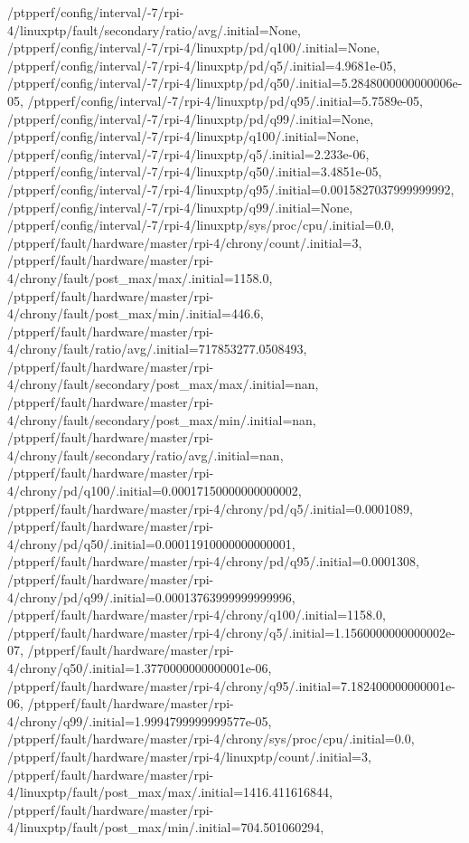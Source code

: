{    /ptpperf/config/interval/-7/rpi-4/linuxptp/fault/secondary/ratio/avg/.initial=None,
    /ptpperf/config/interval/-7/rpi-4/linuxptp/pd/q100/.initial=None,
    /ptpperf/config/interval/-7/rpi-4/linuxptp/pd/q5/.initial=4.9681e-05,
    /ptpperf/config/interval/-7/rpi-4/linuxptp/pd/q50/.initial=5.2848000000000006e-05,
    /ptpperf/config/interval/-7/rpi-4/linuxptp/pd/q95/.initial=5.7589e-05,
    /ptpperf/config/interval/-7/rpi-4/linuxptp/pd/q99/.initial=None,
    /ptpperf/config/interval/-7/rpi-4/linuxptp/q100/.initial=None,
    /ptpperf/config/interval/-7/rpi-4/linuxptp/q5/.initial=2.233e-06,
    /ptpperf/config/interval/-7/rpi-4/linuxptp/q50/.initial=3.4851e-05,
    /ptpperf/config/interval/-7/rpi-4/linuxptp/q95/.initial=0.0015827037999999992,
    /ptpperf/config/interval/-7/rpi-4/linuxptp/q99/.initial=None,
    /ptpperf/config/interval/-7/rpi-4/linuxptp/sys/proc/cpu/.initial=0.0,
    /ptpperf/fault/hardware/master/rpi-4/chrony/count/.initial=3,
    /ptpperf/fault/hardware/master/rpi-4/chrony/fault/post_max/max/.initial=1158.0,
    /ptpperf/fault/hardware/master/rpi-4/chrony/fault/post_max/min/.initial=446.6,
    /ptpperf/fault/hardware/master/rpi-4/chrony/fault/ratio/avg/.initial=717853277.0508493,
    /ptpperf/fault/hardware/master/rpi-4/chrony/fault/secondary/post_max/max/.initial=nan,
    /ptpperf/fault/hardware/master/rpi-4/chrony/fault/secondary/post_max/min/.initial=nan,
    /ptpperf/fault/hardware/master/rpi-4/chrony/fault/secondary/ratio/avg/.initial=nan,
    /ptpperf/fault/hardware/master/rpi-4/chrony/pd/q100/.initial=0.00017150000000000002,
    /ptpperf/fault/hardware/master/rpi-4/chrony/pd/q5/.initial=0.0001089,
    /ptpperf/fault/hardware/master/rpi-4/chrony/pd/q50/.initial=0.00011910000000000001,
    /ptpperf/fault/hardware/master/rpi-4/chrony/pd/q95/.initial=0.0001308,
    /ptpperf/fault/hardware/master/rpi-4/chrony/pd/q99/.initial=0.00013763999999999996,
    /ptpperf/fault/hardware/master/rpi-4/chrony/q100/.initial=1158.0,
    /ptpperf/fault/hardware/master/rpi-4/chrony/q5/.initial=1.1560000000000002e-07,
    /ptpperf/fault/hardware/master/rpi-4/chrony/q50/.initial=1.3770000000000001e-06,
    /ptpperf/fault/hardware/master/rpi-4/chrony/q95/.initial=7.182400000000001e-06,
    /ptpperf/fault/hardware/master/rpi-4/chrony/q99/.initial=1.9994799999999577e-05,
    /ptpperf/fault/hardware/master/rpi-4/chrony/sys/proc/cpu/.initial=0.0,
    /ptpperf/fault/hardware/master/rpi-4/linuxptp/count/.initial=3,
    /ptpperf/fault/hardware/master/rpi-4/linuxptp/fault/post_max/max/.initial=1416.411616844,
    /ptpperf/fault/hardware/master/rpi-4/linuxptp/fault/post_max/min/.initial=704.501060294,
}
